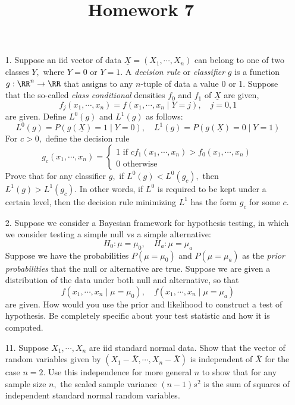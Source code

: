 \documentclass{article}
\begin{document}
\title{Homework 7}
\maketitle
\thispagestyle{fancy}

\begin{enumerate}
	\item[1.] Suppose an iid vector of data $\underline{X}=(X_1,\cdots, X_n)$ can belong to one of two classes $Y,$ where $Y=0$ or $Y=1.$ A \textit{decision rule} or \textit{classifier} $g$ is a function $g:\RR^n\to \RR$ that assigns to any $n$-tuple of data a value 0 or 1. Suppose that the so-called \textit{class conditional} densities $f_0$ and $f_1$ of $\underline{X}$ are given, \[f_j(x_1, \cdots, x_n)=f(x_1, \cdots, x_n\mid Y=j), \quad j=0, 1\] are given. Define $L^0(g)$ and $L^1(g)$ as follows: \[L^0(g) = P(g(\underline{X})=1\mid Y=0), \quad L^1(g) = P(g(\underline{X})=0\mid Y=1)\] For $c>0,$ define the decision rule \[g_c(x_1, \cdots, x_n)=\begin{cases}
				1 \text{ if } cf_1(x_1, \cdots, x_n)>f_0(x_1,\cdots, x_n) \\
				0\text{ otherwise}
		\end{cases} \] Prove that for any classifier $g,$ if $L^0(g)<L^0(g_c),$ then $L^1(g)>L^1(g_c).$ In other words, if $L^0$ is required to be kept under a certain level, then the decision rule minimizing $L^1$ has the form $g_c$ for some $c.$

	\item[2.] Suppose we consider a Bayesian framework for hypothesis testing, in which we consider testing a simple null vs a simple alternative: \[H_0: \mu=\mu_0, \quad H_a: \mu=\mu_a\] Suppose we have the probabilities $P(\mu=\mu_0)$ and $P(\mu=\mu_a)$ as the \textit{prior probabilities} that the null or alternative are true. Suppose we are given a distribution of the data under both null and alternative, so that \[f(x_1, \cdots, x_n\mid \mu=\mu_0), \quad f(x_1, \cdots, x_n\mid \mu=\mu_a)\] are given. How would you use the prior and likelihood to construct a test of hypothesis. Be completely specific about your test statistic and how it is computed.

	\item[11.] Suppose $X_1, \cdots, X_n$ are iid standard normal data. Show that the vector of random variables given by $(X_1-\bar{X}, \cdots, X_n-\bar{X})$ is independent of $\bar{X}$ for the case $n=2.$ Use this independence for more general $n$ to show that for any sample size $n,$ the scaled sample variance $(n-1)s^2$ is the sum of squares of independent standard normal random variables.

\end{enumerate}
\end{document}
